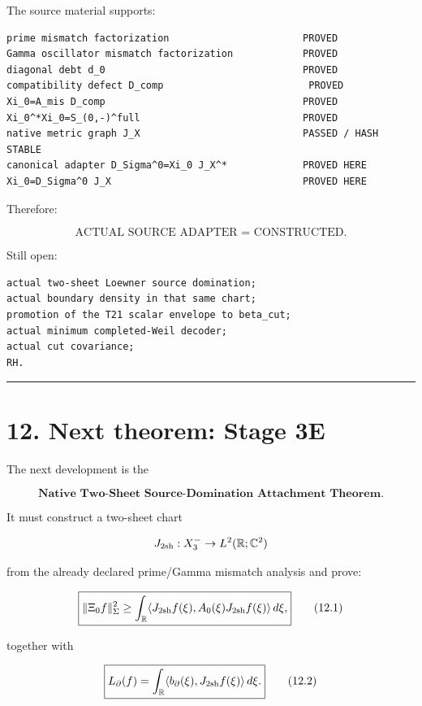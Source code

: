 The source material supports:

\begin{verbatim}
prime mismatch factorization                       PROVED
Gamma oscillator mismatch factorization            PROVED
diagonal debt d_0                                  PROVED
compatibility defect D_comp                         PROVED
Xi_0=A_mis D_comp                                  PROVED
Xi_0^*Xi_0=S_(0,-)^full                            PROVED
native metric graph J_X                            PASSED / HASH STABLE
canonical adapter D_Sigma^0=Xi_0 J_X^*             PROVED HERE
Xi_0=D_Sigma^0 J_X                                 PROVED HERE
\end{verbatim}

Therefore:

\[
\boxed{
\text{ACTUAL SOURCE ADAPTER = CONSTRUCTED.}
}
\]

Still open:

\begin{verbatim}
actual two-sheet Loewner source domination;
actual boundary density in that same chart;
promotion of the T21 scalar envelope to beta_cut;
actual minimum completed-Weil decoder;
actual cut covariance;
RH.
\end{verbatim}

\begin{center}\rule{0.5\linewidth}{0.5pt}\end{center}

\hypertarget{next-theorem-stage-3e}{%
\section{12. Next theorem: Stage 3E}\label{next-theorem-stage-3e}}

The next development is the

\[
\boxed{
\textbf{Native Two-Sheet Source-Domination Attachment Theorem.}
}
\]

It must construct a two-sheet chart

\[
J_{\rm 2sh}:X_3^-\to
L^2(\mathbb R;\mathbb C^2)
\]

from the already declared prime/Gamma mismatch analysis and prove:

\[
\boxed{
\|\Xi_0f\|_\Sigma^2
\ge
\int_{\mathbb R}
\langle
J_{\rm 2sh}f(\xi),
A_0(\xi)J_{\rm 2sh}f(\xi)
\rangle
\,d\xi,
}
\tag{12.1}
\]

together with

\[
\boxed{
L_\partial(f)
=
\int_{\mathbb R}
\langle
b_\partial(\xi),
J_{\rm 2sh}f(\xi)
\rangle
\,d\xi.
}
\tag{12.2}
\]

